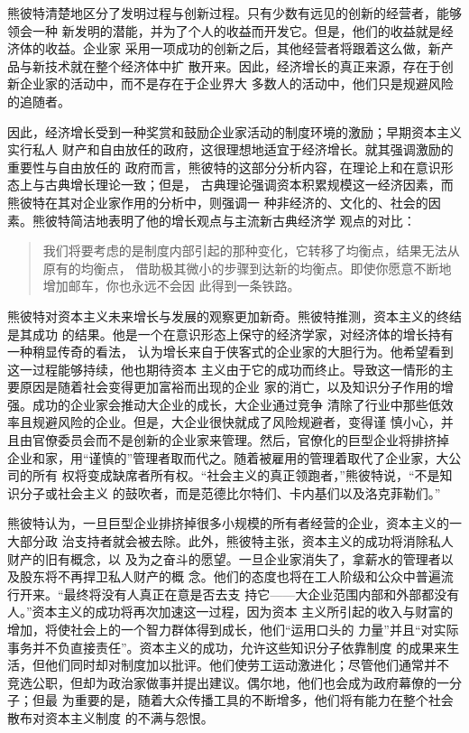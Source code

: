 熊彼特清楚地区分了发明过程与创新过程。只有少数有远见的创新的经营者，能够领会一种
新发明的潜能，并为了个人的收益而开发它。但是，他们的收益就是经济体的收益。企业家
采用一项成功的创新之后，其他经营者将跟着这么做，新产品与新技术就在整个经济体中扩
散开来。因此，经济增长的真正来源，存在于创新企业家的活动中，而不是存在于企业界大
多数人的活动中，他们只是规避风险的追随者。

因此，经济增长受到一种奖赏和鼓励企业家活动的制度环境的激励；早期资本主义实行私人
财产和自由放任的政府，这很理想地适宜于经济增长。就其强调激励的重要性与自由放任的
政府而言，熊彼特的这部分分析内容，在理论上和在意识形态上与古典增长理论一致；但是，
古典理论强调资本积累规模这一经济因素，而熊彼特在其对企业家作用的分析中，则强调一
种非经济的、文化的、社会的因素。熊彼特简洁地表明了他的增长观点与主流新古典经济学
观点的对比：

\begin{quotation}
  我们将要考虑的是制度内部引起的那种变化，它转移了均衡点，结果无法从原有的均衡点，
  借助极其微小的步骤到达新的均衡点。即使你愿意不断地增加邮车，你也永远不会因
  此得到一条铁路。
\end{quotation}

熊彼特对资本主义未来增长与发展的观察更加新奇。熊彼特推测，资本主义的终结是其成功
的结果。他是一个在意识形态上保守的经济学家，对经济体的增长持有一种稍显传奇的看法，
认为增长来自于侠客式的企业家的大胆行为。他希望看到这一过程能够持续，他也期待资本
主义由于它的成功而终止。导致这一情形的主要原因是随着社会变得更加富裕而出现的企业
家的消亡，以及知识分子作用的增强。成功的企业家会推动大企业的成长，大企业通过竞争
清除了行业中那些低效率且规避风险的企业。但是，大企业很快就成了风险规避者，变得谨
慎小心，并且由官僚委员会而不是创新的企业家来管理。然后，官僚化的巨型企业将排挤掉
企业和家，用“谨慎的”管理者取而代之。随着被雇用的管理着取代了企业家，大公司的所有
权将变成缺席者所有权。“社会主义的真正领跑者，”熊彼特说，“不是知识分子或社会主义
的鼓吹者，而是范德比尔特们、卡内基们以及洛克菲勒们。”

熊彼特认为，一旦巨型企业排挤掉很多小规模的所有者经营的企业，资本主义的一大部分政
治支持者就会被去除。此外，熊彼特主张，资本主义的成功将消除私人财产的旧有概念，以
及为之奋斗的愿望。一旦企业家消失了，拿薪水的管理者以及股东将不再捍卫私人财产的概
念。他们的态度也将在工人阶级和公众中普遍流行开来。“最终将没有人真正在意是否去支
持它——大企业范围内部和外部都没有人。”资本主义的成功将再次加速这一过程，因为资本
主义所引起的收入与财富的增加，将使社会上的一个智力群体得到成长，他们“运用口头的
力量”并且“对实际事务并不负直接责任”。资本主义的成功，允许这些知识分子依靠制度
的成果来生活，但他们同时却对制度加以批评。他们使劳工运动激进化；尽管他们通常并不
竞选公职，但却为政治家做事并提出建议。偶尔地，他们也会成为政府幕僚的一分子；但最
为重要的是，随着大众传播工具的不断增多，他们将有能力在整个社会散布对资本主义制度
的不满与怨恨。

